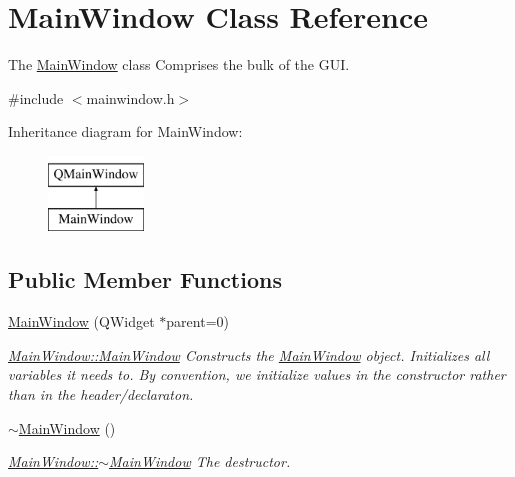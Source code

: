 \hypertarget{class_main_window}{}\section{Main\+Window Class Reference}
\label{class_main_window}


The \hyperlink{class_main_window}{Main\+Window} class Comprises the bulk of the G\+UI.  




{\ttfamily \#include $<$mainwindow.\+h$>$}

Inheritance diagram for Main\+Window\+:\begin{figure}[H]
\begin{center}
\leavevmode
\includegraphics[height=2.000000cm]{class_main_window}
\end{center}
\end{figure}
\subsection*{Public Member Functions}
\begin{DoxyCompactItemize}
\item 
\hyperlink{class_main_window_a8b244be8b7b7db1b08de2a2acb9409db}{Main\+Window} (Q\+Widget $\ast$parent=0)
\begin{DoxyCompactList}\small\item\em \hyperlink{class_main_window_a8b244be8b7b7db1b08de2a2acb9409db}{Main\+Window\+::\+Main\+Window} Constructs the \hyperlink{class_main_window}{Main\+Window} object. Initializes all variables it needs to. By convention, we initialize values in the constructor rather than in the header/declaraton. \end{DoxyCompactList}\item 
\hypertarget{class_main_window_ae98d00a93bc118200eeef9f9bba1dba7}{}\label{class_main_window_ae98d00a93bc118200eeef9f9bba1dba7} 
\hyperlink{class_main_window_ae98d00a93bc118200eeef9f9bba1dba7}{$\sim$\+Main\+Window} ()
\begin{DoxyCompactList}\small\item\em \hyperlink{class_main_window_ae98d00a93bc118200eeef9f9bba1dba7}{Main\+Window\+::$\sim$\+Main\+Window} The destructor. \end{DoxyCompactList}\end{DoxyCompactItemize}
